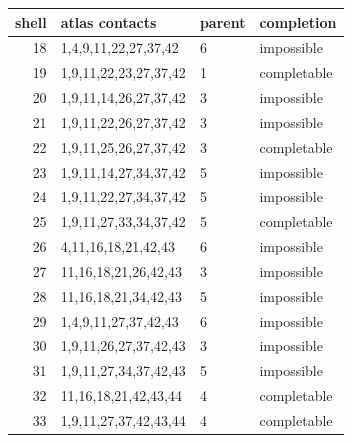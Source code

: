 \begin{tabular}{rlll}
\toprule
shell & atlas contacts & parent & completion \\
\midrule
18 & 1,4,9,11,22,27,37,42 & 6 & impossible \\
19 & 1,9,11,22,23,27,37,42 & 1 & completable \\
20 & 1,9,11,14,26,27,37,42 & 3 & impossible \\
21 & 1,9,11,22,26,27,37,42 & 3 & impossible \\
22 & 1,9,11,25,26,27,37,42 & 3 & completable \\
23 & 1,9,11,14,27,34,37,42 & 5 & impossible \\
24 & 1,9,11,22,27,34,37,42 & 5 & impossible \\
25 & 1,9,11,27,33,34,37,42 & 5 & completable \\
26 & 4,11,16,18,21,42,43 & 6 & impossible \\
27 & 11,16,18,21,26,42,43 & 3 & impossible \\
28 & 11,16,18,21,34,42,43 & 5 & impossible \\
29 & 1,4,9,11,27,37,42,43 & 6 & impossible \\
30 & 1,9,11,26,27,37,42,43 & 3 & impossible \\
31 & 1,9,11,27,34,37,42,43 & 5 & impossible \\
32 & 11,16,18,21,42,43,44 & 4 & completable \\
33 & 1,9,11,27,37,42,43,44 & 4 & completable \\
\bottomrule
\end{tabular}
